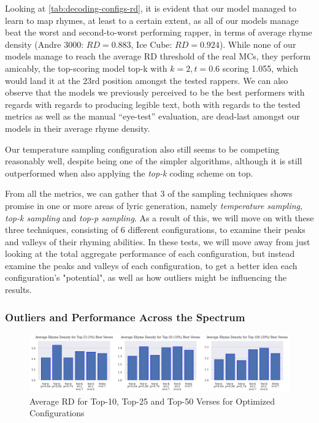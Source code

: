 Looking at \cref{tab:decoding-configs-rd}, it is evident that our model managed to learn to map rhymes, at least to a certain extent, as all of our models manage beat the worst and second-to-worst performing rapper, in terms of average rhyme density (Andre 3000: $RD=0.883$, Ice Cube: $RD=0.924$). While none of our models manage to reach the average RD threshold of the real MCs, they perform amicably, the top-scoring model top-k with $k=2, t=0.6$ scoring 1.055, which would land it at the 23rd position amongst the tested rappers. We can also observe that the models we previously perceived to be the best performers with regards with regards to producing legible text, both with regards to the tested metrics as well as the manual “eye-test” evaluation, are dead-last amongst our models in their average rhyme density.

Our temperature sampling configuration also still seems to be competing reasonably well, despite being one of the simpler algorithms, although it is still outperformed when also applying the \textit{top-k} coding scheme on top.

From all the metrics, we can gather that 3 of the sampling techniques shows promise in one or more areas of lyric generation, namely \textit{temperature sampling}, \textit{top-k sampling} and \textit{top-p sampling}. As a result of this, we will move on with these three techniques, consisting of 6 different configurations, to examine their peaks and valleys of their rhyming abilities. In these tests, we will move away from just looking at the total aggregate performance of each configuration, but instead examine the peaks and valleys of each configuration, to get a better idea each configuration's "potential", as well as how outliers might be influencing the results.

\subsubsection{Outliers and Performance Across the Spectrum}
\label{sec:outliers+performance-spectrum}

\begin{figure}[ht!]
    \includegraphics[height=\textheight, width=\textwidth, keepaspectratio=true]{figures/top_verse_rd.png}
    \caption{Average RD for Top-10, Top-25 and Top-50 Verses for Optimized Configurations}
    \label{fig:avg_rd_top}
\end{figure}

